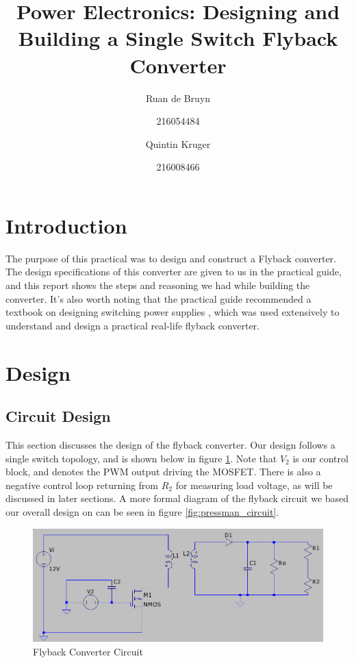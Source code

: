 \documentclass[a4paper, 12pt]{article}
\title{Power Electronics: Designing and Building a Single Switch Flyback Converter}
\author{Ruan de Bruyn \and 216054484 \and Quintin Kruger \and 216008466}
\begin{document}
\maketitle
\newpage
{}
\tableofcontents
\listoffigures
\newpage
{}

\section{Introduction}

The purpose of this practical was to design and construct a Flyback converter.
The design specifications of this converter are given to us in the practical
guide, and this report shows the steps and reasoning we had while building the
converter. It's also worth noting that the practical guide recommended a
textbook on designing switching power supplies \cite{pressman}, which was used
extensively to understand and design a practical real-life flyback converter.


\section{Design}

\subsection{Circuit Design}

This section discusses the design of the flyback converter. Our design follows
a single switch topology, and is shown below in figure
\ref{fig:circuit_diagram}. Note that $V_2$ is our control block, and denotes
the PWM output driving the MOSFET. There is also a negative control loop
returning from $R_2$ for measuring load voltage, as will be discussed in later
sections. A more formal diagram of the flyback circuit we based our overall
design on can be seen in figure \ref{fig:pressman_circuit}.

\begin{figure}[H]
  \centering
  \includegraphics[width=\textwidth]{./images/circuit_diagram.png}
  \caption{Flyback Converter Circuit}
  \label{fig:circuit_diagram}
\end{figure}
\end{document}
